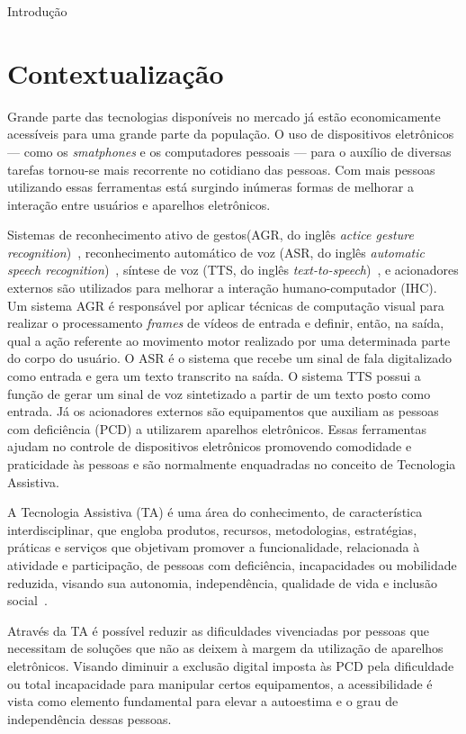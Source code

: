 \begin{chapter}{Introdução}

\section{Contextualização}
Grande parte das tecnologias disponíveis no mercado já estão economicamente
acessíveis para uma grande parte da população. O uso de dispositivos eletrônicos
--- como os \textit{smatphones} e os computadores pessoais --- para o auxílio de
diversas tarefas tornou-se mais recorrente no cotidiano das pessoas. Com mais
pessoas utilizando essas ferramentas está surgindo inúmeras formas de melhorar a
interação entre usuários e aparelhos eletrônicos.

Sistemas de reconhecimento ativo de gestos(AGR, do inglês \textit{actice gesture
recognition})~\cite{Darrel96}, reconhecimento automático de voz (ASR, do inglês
\textit{automatic speech recognition})~\cite{Taylor09}, síntese de voz (TTS, do inglês \textit{
text-to-speech})~\cite{Huang01}, e acionadores externos são utilizados para melhorar a 
interação humano-computador (IHC). Um sistema AGR é responsável por aplicar
técnicas de computação visual para realizar o processamento \textit{frames} de
vídeos de entrada e definir, então, na saída, qual a ação referente ao movimento
motor realizado por uma determinada parte do corpo do usuário. O ASR é o sistema
que recebe um sinal de fala digitalizado como entrada e gera um texto transcrito
na saída. O sistema TTS possui a função de gerar um sinal de voz sintetizado a
partir de um texto posto como entrada. Já os acionadores externos são
equipamentos que auxiliam as pessoas com deficiência (PCD) a utilizarem
aparelhos eletrônicos. Essas ferramentas ajudam  no controle de dispositivos
eletrônicos promovendo comodidade e praticidade às pessoas e são normalmente
enquadradas no conceito de Tecnologia Assistiva.

A Tecnologia Assistiva (TA) é uma área do conhecimento, de característica
interdisciplinar, que engloba produtos, recursos, metodologias, estratégias,
práticas e serviços que objetivam promover a funcionalidade, relacionada à
atividade e participação, de pessoas com deficiência, incapacidades ou
mobilidade reduzida, visando sua autonomia, independência, qualidade de vida e
inclusão social~\cite{cat09}.

Através da TA é possível reduzir as dificuldades vivenciadas por pessoas que
necessitam de soluções que não as deixem à margem da utilização de aparelhos
eletrônicos. Visando diminuir a exclusão digital imposta às PCD pela dificuldade
ou total incapacidade para manipular certos equipamentos, a acessibilidade é
vista como elemento fundamental para elevar a autoestima e o grau de
independência dessas pessoas.


\end{chapter}
